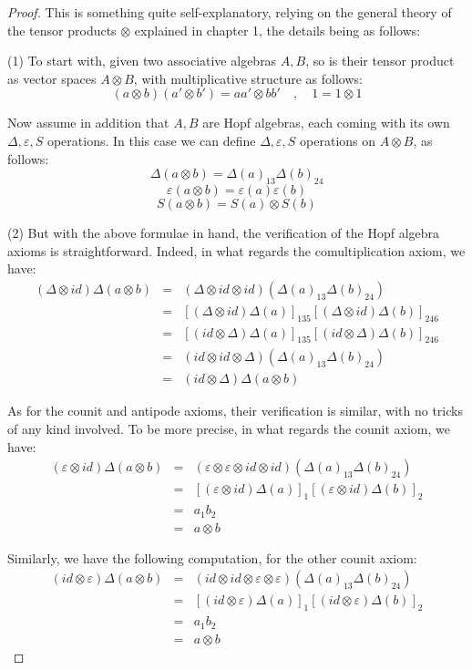 \documentclass[12pt]{amsbook}
\begin{document}
\begin{proof}
This is something quite self-explanatory, relying on the general theory of the tensor products $\otimes$ explained in chapter 1, the details being as follows:

\medskip

(1) To start with, given two associative algebras $A,B$, so is their tensor product as vector spaces $A\otimes B$, with multiplicative structure as follows:
$$(a\otimes b)(a'\otimes b')=aa'\otimes bb'\quad,\quad 1=1\otimes1$$

Now assume in addition that $A,B$ are Hopf algebras, each coming with its own $\Delta,\varepsilon,S$ operations. In this case we can define $\Delta,\varepsilon,S$ operations on $A\otimes B$, as follows:
$$\Delta(a\otimes b)=\Delta(a)_{13}\Delta(b)_{24}$$
$$\varepsilon(a\otimes b)=\varepsilon(a)\varepsilon(b)$$
$$S(a\otimes b)=S(a)\otimes S(b)$$

(2) But with the above formulae in hand, the verification of the Hopf algebra axioms is straightforward. Indeed, in what regards the comultiplication axiom, we have:
\begin{eqnarray*}
(\Delta\otimes id)\Delta(a\otimes b)
&=&(\Delta\otimes id\otimes id)(\Delta(a)_{13}\Delta(b)_{24})\\
&=&[(\Delta\otimes id)\Delta(a)]_{135}[(\Delta\otimes id)\Delta(b)]_{246}\\
&=&[(id\otimes\Delta)\Delta(a)]_{135}[(id\otimes\Delta)\Delta(b)]_{246}\\
&=&(id\otimes id\otimes\Delta)(\Delta(a)_{13}\Delta(b)_{24})\\
&=&(id\otimes\Delta)\Delta(a\otimes b)
\end{eqnarray*}

As for the counit and antipode axioms, their verification is similar, with no tricks of any kind involved. To be more precise, in what regards the counit axiom, we have:
\begin{eqnarray*}
(\varepsilon\otimes id)\Delta(a\otimes b)
&=&(\varepsilon\otimes\varepsilon\otimes id\otimes id)(\Delta(a)_{13}\Delta(b)_{24})\\
&=&[(\varepsilon\otimes id)\Delta(a)]_1[(\varepsilon\otimes id)\Delta(b)]_2\\
&=&a_1b_2\\
&=&a\otimes b
\end{eqnarray*}

Similarly, we have the following computation, for the other counit axiom:
\begin{eqnarray*}
(id\otimes\varepsilon)\Delta(a\otimes b)
&=&( id\otimes id\otimes\varepsilon\otimes\varepsilon)(\Delta(a)_{13}\Delta(b)_{24})\\
&=&[(id\otimes\varepsilon)\Delta(a)]_1[(id\otimes\varepsilon)\Delta(b)]_2\\
&=&a_1b_2\\
&=&a\otimes b
\end{eqnarray*}


\end{proof}
\end{document}
